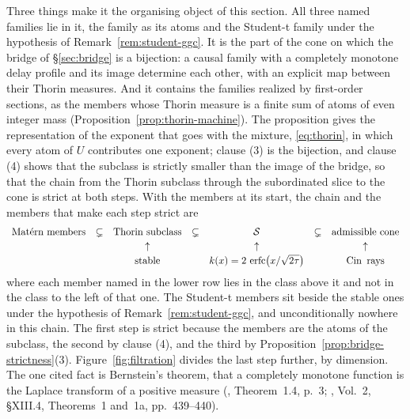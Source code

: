 Three things make it the organising object of this section. All three named families lie in
it, the \Matern{} family as its atoms and the Student-t family under the hypothesis of
Remark~\ref{rem:student-ggc}. It is the part of the cone on which the bridge of
\S\ref{sec:bridge} is a bijection: a causal family with a completely monotone delay profile and
its image determine each other, with an explicit map between their Thorin measures. And it
contains the families realized by first-order sections, as the members whose Thorin measure is a finite
sum of atoms of even integer mass (Proposition~\ref{prop:thorin-machine}). The
proposition gives the representation of the exponent that goes with the mixture,
\ref{eq:thorin}, in which every atom of $U$ contributes one \Matern{} exponent; clause (3) is
the bijection, and clause (4) shows that the subclass is strictly smaller than the image of the
bridge, so that the chain from the Thorin subclass through the subordinated slice to the cone
is strict at both steps. With the \Matern{} members at its start, the chain and the members
that make each step strict are
\[
\begin{array}{ccccccc}
\text{Mat\'ern{} members} & \subsetneq & \text{Thorin subclass} & \subsetneq & \mathcal{S}
  & \subsetneq & \text{admissible cone} \\[2pt]
 & & \uparrow & & \uparrow & & \uparrow \\[2pt]
 & & \text{stable} & & k(x) = 2\,\operatorname{erfc}\bigl(x/\sqrt{2\tau}\bigr) & & \operatorname{Cin}\ \text{rays}
\end{array}
\]
where each member named in the lower row lies in the class above it and not in the class to
the left of that one. The Student-t members sit beside the stable ones under the hypothesis of
Remark~\ref{rem:student-ggc}, and unconditionally nowhere in this chain. The first step is strict
because the \Matern{} members are the atoms of
the subclass, the second by clause (4), and the third by
Proposition~\ref{prop:bridge-strictness}(3). Figure~\ref{fig:filtration} divides the last step
further, by dimension. The one cited fact is Bernstein's theorem, that a completely monotone
function is the Laplace transform of a positive measure (,
Theorem~1.4, p.~3; , Vol.~2, \S XIII.4, Theorems~1 and~1a,
pp.~439--440).

